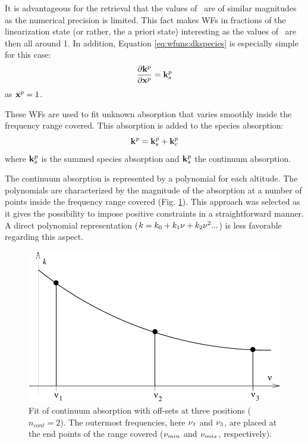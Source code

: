  It is advantageous for the retrieval that the values of \xt\ are of
 similar magnitudes \citep{schimpf:97,eriksson:99} as the numerical
 precision is limited. This fact makes WFs
 in fractions of the linearization state (or rather, the a priori
 state) interesting as the values of \xt\ are then all around 1. In 
 addition, Equation \ref{eq:wfuns:dkspecies} is especially simple
 for this case:
 \begin{equation}
   \frac{\partial \mathbf{k}^p}{\partial \mathbf{x}^p} = \mathbf{k}^p_s
 \end{equation}
 as $\mathbf{x}^p=1$.


 \label{sec:wfuns:cont}

 These WFs are used to fit unknown absorption that varies smoothly inside
 the frequency range covered. This absorption
 is added to the species absorption:
 \begin{equation}
   \mathbf{k}^p = \mathbf{k}^p_s + \mathbf{k}^p_c
 \end{equation}
 where $\mathbf{k}^p_s$ is the summed species absorption and $\mathbf{k}^p_s$
 the continuum absorption.
 
 The continuum absorption is represented by a polynomial for each
 altitude. The polynomials are characterized by the magnitude of the
 absorption at a number of points inside the frequency range covered
 (Fig. \ref{fig:wfuns:cont}). This approach was selected as it gives
 the possibility to impose positive constraints in a straightforward
 manner. A direct polynomial representation ($k=k_0+k_1\nu+k_2\nu^2...$) 
 is less favorable regarding this aspect.
 
 \begin{figure}[t]
  \begin{center}
   \includegraphics*[width=0.95\hsize]{Figs/contfit}
   \caption{Fit of continuum absorption with off-sets at three 
            positions ($n_{cont}=2$). The outermost frequencies, here 
            $\nu_1$ and $\nu_3$, are placed at the end points of the 
            range covered ($\nu_{min}$ and $\nu_{max}$, respectively).}
   \label{fig:wfuns:cont}  
  \end{center}
 \end{figure}

